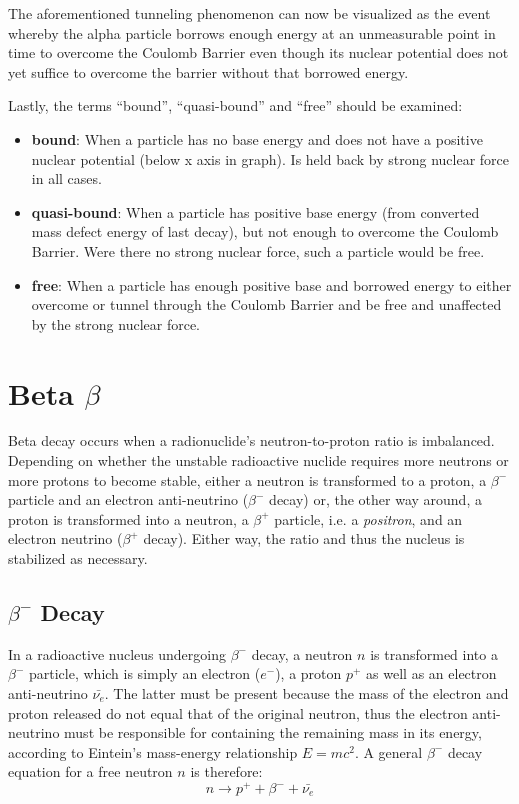 \pagebreak

The aforementioned tunneling phenomenon can now be visualized as the event whereby the alpha particle borrows enough energy at an unmeasurable point in time to overcome the Coulomb Barrier even though its nuclear potential does not yet suffice to overcome the barrier without that borrowed energy.

Lastly, the terms ``bound'', ``quasi-bound'' and ``free'' should be examined:

\begin{itemize}
  \item \textbf{bound}: When a particle has no base energy and does not have a positive nuclear potential (below x axis in graph). Is held back by strong nuclear force in all cases.

  \item \textbf{quasi-bound}: When a particle has positive base energy (from converted mass defect energy of last decay), but not enough to overcome the Coulomb Barrier. Were there no strong nuclear force, such a particle would be free.

  \item \textbf{free}: When a particle has enough positive base and borrowed energy to either overcome or tunnel through the Coulomb Barrier and be free and unaffected by the strong nuclear force.
\end{itemize}

\section*{Beta $\beta$}

Beta decay occurs when a radionuclide's neutron-to-proton ratio is imbalanced. Depending on whether the unstable radioactive nuclide requires more neutrons or more protons to become stable, either a neutron is transformed to a proton, a $\beta^-$ particle and an electron anti-neutrino ($\beta^-$ decay) or, the other way around, a proton is transformed into a neutron, a $\beta^+$ particle, i.e. a \emph{positron}, and an electron neutrino ($\beta^+$ decay). Either way, the ratio and thus the nucleus is stabilized as necessary.

\subsection*{$\beta^-$ Decay}

In a radioactive nucleus undergoing $\beta^-$ decay, a neutron $n$ is transformed into a $\beta^-$ particle, which is simply an electron ($e^-$), a proton $p^+$ as well as an electron anti-neutrino $\bar{\nu_{e}}$. The latter must be present because the mass of the electron and proton released do not equal that of the original neutron, thus the electron anti-neutrino must be responsible for containing the remaining mass in its energy, according to Eintein's mass-energy relationship $E = mc^2$. A general $\beta^-$ decay equation for a free neutron $n$ is therefore: $$n \rightarrow p^+ + \beta^- + \bar{\nu_{e}}$$

